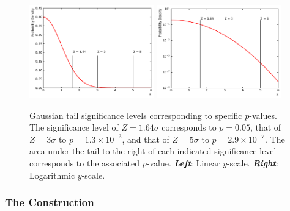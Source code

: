 \begin{figure}[!htb]
    \begin{center}
        \includegraphics[width=0.48\textwidth]{figures/common_ana/stat_hypo/pval_sig_lin}
        \includegraphics[width=0.48\textwidth]{figures/common_ana/stat_hypo/pval_sig_log}
        \caption{
            Gaussian tail significance levels corresponding to specific $p$-values.
            The significance level of $Z=1.64\sigma$ corresponds to $p = 0.05$,
            that of $Z=3\sigma$ to $p = 1.3 \times 10^{-3}$, and that of
            $Z = 5\sigma$ to $p = 2.9\times 10^{-7}$.
            The area under the tail to the right of each indicated significance level corresponds to
            the associated $p$-value.
            \textbf{\textit{Left}}: Linear $y$-scale. \textbf{\textit{Right}}: Logarithmic $y$-scale.
        }
        \label{fig:pval_sig}
    \end{center}
\end{figure}

%
%

\subsubsection{The \cls Construction}
\label{sec:cls_method}


